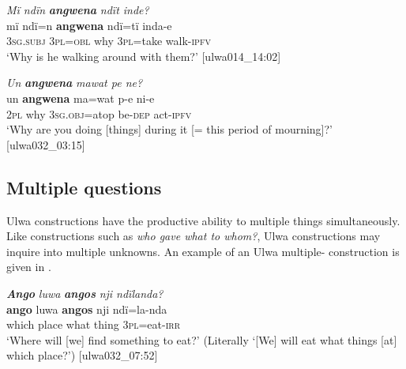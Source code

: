\ea%
    \label{ex:syntax:58}
          \textit{Mï ndïn} \textbf{\textit{angwena}} \textit{ndït inde?}\\
\gll    mï      ndï=n    \textbf{angwena}  ndï=tï    inda-e\\
    3\textsc{sg.subj}  3\textsc{pl=obl}  why    3\textsc{pl}=take  walk-\textsc{ipfv}\\
\glt `Why is he walking around with them?’ [ulwa014\_14:02]
\z

\ea%
    \label{ex:syntax:59}
          \textit{Un} \textbf{\textit{angwena}} \textit{mawat pe ne?}\\
\gll    un    \textbf{angwena}  ma=wat    p-e    ni{}-e\\
    2\textsc{pl}    why    3\textsc{sg.obj}=atop  be\textsc{{}-dep} act-\textsc{ipfv}\\
\glt `Why are you doing [things] during it [= this period of mourning]?’ [ulwa032\_03:15]
\z

\subsection{Multiple questions}\label{sec:13.1.3}


Ulwa  constructions have the productive ability to  multiple things simultaneously. Like  constructions such as \textit{who gave what to whom?}, Ulwa constructions may inquire into multiple unknowns. An example of an Ulwa multiple- construction is given in .

\ea%
    \label{ex:syntax:60}
          \textbf{\textit{Ango}} \textit{luwa} \textbf{\textit{angos}} \textit{nji ndïlanda?}\\
\gll    \textbf{ango}  luwa  \textbf{angos}  nji    ndï=la-nda\\
    which  place  what  thing  3\textsc{pl}=eat-\textsc{irr}\\
\glt `Where will [we] find something to eat?’ (Literally ‘[We] will eat what things [at] which place?’) [ulwa032\_07:52]
\z

